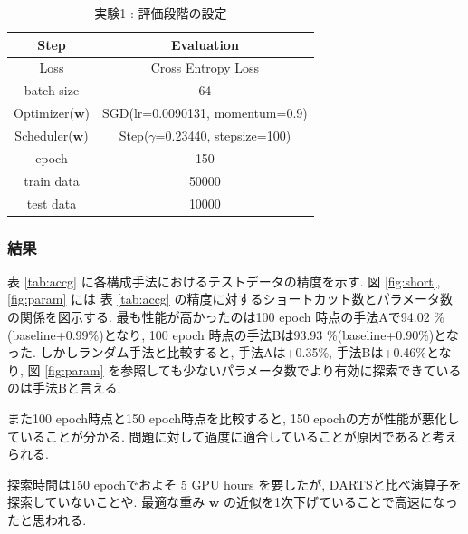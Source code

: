 \begin{table}[tb]
  \begin{center}
    \caption{実験1 : 評価段階の設定}
  	\vspace{3mm}
    \begin{tabular}{|c|c|} \hline
      Step & Evaluation \\ \hline\hline
      Loss & Cross Entropy Loss \\ \hline
      batch size & 64 \\ \hline
      Optimizer($\bm{w}$) & SGD(lr=0.0090131, momentum=0.9) \\ \hline
      Scheduler($\bm{w}$) & Step($\gamma$=0.23440, stepsize=100) \\ \hline
      epoch & 150\\ \hline
      train data & 50000\\ \hline
      test data &  10000\\ \hline
    \end{tabular}
    \label{tab:exp2/eval}
  \end{center}
\end{table}


\clearpage
\changeindent{0cm}
\subsubsection{結果}
\label{sec:exp.01_02}
\changeindent{2cm}



表 \ref{tab:accg} に各構成手法におけるテストデータの精度を示す.
図 \ref{fig:short}, \ref{fig:param} には
表 \ref{tab:accg} の精度に対するショートカット数とパラメータ数の関係を図示する.
最も性能が高かったのは100 epoch 時点の手法Aで94.02 \%(baseline+0.99\%)となり,
100 epoch 時点の手法Bは93.93 \%(baseline+0.90\%)となった.
しかしランダム手法と比較すると, 手法Aは+0.35\%, 手法Bは+0.46\%となり,
図 \ref{fig:param} を参照しても少ないパラメータ数でより有効に探索できているのは手法Bと言える.

また100 epoch時点と150 epoch時点を比較すると, 150 epochの方が性能が悪化していることが分かる.
問題に対して過度に適合していることが原因であると考えられる.

探索時間は150 epochでおよそ 5 GPU hours を要したが, DARTSと比べ演算子を探索していないことや.
最適な重み $\bm{w}$ の近似を1次下げていることで高速になったと思われる.



